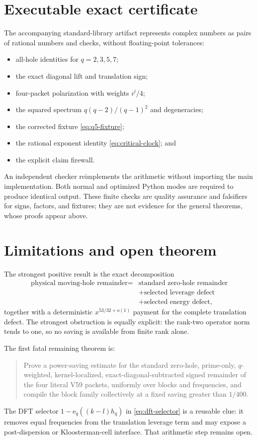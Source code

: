 \documentclass[11pt]{article}
\newcommand{\e}{\mathrm e}
\begin{document}
\section{Executable exact certificate}

The accompanying standard-library artifact represents complex numbers as
pairs of rational numbers and checks, without floating-point tolerances:
\begin{itemize}[leftmargin=2em]
 \item all-hole identities for $q=2,3,5,7$;
 \item the exact diagonal lift and translation sign;
 \item four-packet polarization with weights $i^j/4$;
 \item the squared spectrum $q(q-2)/(q-1)^2$ and degeneracies;
 \item the corrected fixture \eqref{eq:q5-fixture};
 \item the rational exponent identity \eqref{eq:critical-clock}; and
 \item the explicit claim firewall.
\end{itemize}
An independent checker reimplements the arithmetic without importing the
main implementation.  Both normal and optimized Python modes are required to
produce identical output.  These finite checks are quality assurance and
falsifiers for signs, factors, and fixtures; they are not evidence for the
general theorems, whose proofs appear above.

\section{Limitations and open theorem}

The strongest positive result is the exact decomposition
\begin{align*}
 \text{physical moving-hole remainder}
 ={}&\text{standard zero-hole remainder}\\
 &+\text{selected leverage defect}\\
 &+\text{selected energy defect},
\end{align*}
together with a deterministic $x^{53/32+o(1)}$ payment for the complete
translation defect.  The strongest obstruction is equally explicit: the
rank-two operator norm tends to one, so no saving is available from finite
rank alone.

The first fatal remaining theorem is:
\begin{quote}
Prove a power-saving estimate for the standard zero-hole, prime-only,
$q$-weighted, kernel-localized, exact-diagonal-subtracted signed remainder of
the four literal V59 packets, uniformly over blocks and frequencies, and
compile the block family collectively at a fixed saving greater than
$1/400$.
\end{quote}
The DFT selector $1-\e_q((k-l)h_q)$ in
\eqref{eq:dft-selector} is a reusable clue: it removes equal frequencies from
the translation leverage term and may expose a post-dispersion or
Kloosterman-cell interface.  That arithmetic step remains open.
\end{document}
